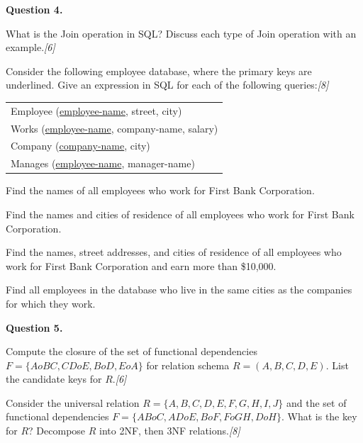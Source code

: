 \documentclass[11pt,a4paper]{article}
\newcommand{\pts}[1]{\hfill   \textit{[#1]}}
\begin{document}
\medskip


\noindent   \textbf{Question 4.}

\begin{parts}
  \item What is the Join operation in SQL? Discuss each type of Join operation with an example.\pts{6}
  \item Consider the following employee database, where the primary keys are underlined. Give an expression in SQL for each of the following queries:\pts{8}
  
\begin{center}
    
\begin{tabular}{l}
      Employee (\underline{employee-name}, street, city) \\
      Works (\underline{employee-name}, company-name, salary) \\
      Company (\underline{company-name}, city) \\
      Manages (\underline{employee-name}, manager-name)
    \end{tabular}
  \end{center}
  
\begin{parts}
    \item Find the names of all employees who work for First Bank Corporation.
    \item Find the names and cities of residence of all employees who work for First Bank Corporation.
    \item Find the names, street addresses, and cities of residence of all employees who work for First Bank Corporation and earn more than \$10,000.
    \item Find all employees in the database who live in the same cities as the companies for which they work.
  \end{parts}
\end{parts}

\medskip


\noindent   \textbf{Question 5.}

\begin{parts}
  \item Compute the closure of the set of functional dependencies $F = \{A  o BC, CD  o E, B  o D, E  o A\}$ for relation schema $R = (A, B, C, D, E)$. List the candidate keys for $R$.\pts{6}
  \item Consider the universal relation $R = \{A, B, C, D, E, F, G, H, I, J\}$ and the set of functional dependencies $F = \{AB  o C, AD  o E, B  o F, F  o GH, D  o H\}$. What is the key for $R$? Decompose $R$ into 2NF, then 3NF relations.\pts{8}
\end{parts}
\end{document}
